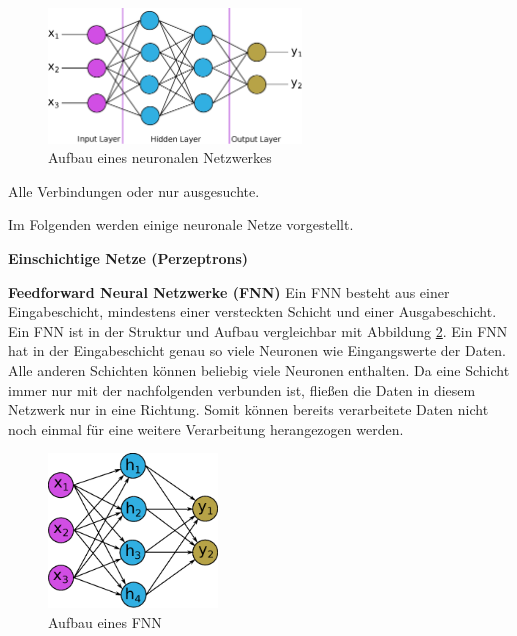 
\begin{figure}[!ht]
	\includegraphics[width=0.6\textwidth]{content/chapter_basics/images/neuronal_network.eps}
	\centering
	\caption{Aufbau eines neuronalen Netzwerkes}
	\label{img:neural_network}
\end{figure}

Alle Verbindungen oder nur ausgesuchte.\vspace{0.2cm}

Im Folgenden werden einige neuronale Netze vorgestellt.\vspace{0.2cm}

\textbf{Einschichtige Netze (Perzeptrons)}\vspace{0.2cm}

\textbf{Feedforward Neural Netzwerke (FNN)}\vspace{0.2cm}
Ein FNN besteht aus einer Eingabeschicht, mindestens einer versteckten Schicht und einer Ausgabeschicht. Ein FNN ist in der Struktur und Aufbau vergleichbar mit Abbildung \ref{img:neural_network_fnn}. Ein FNN hat in der Eingabeschicht genau so viele Neuronen wie Eingangswerte der Daten. Alle anderen Schichten können beliebig viele Neuronen enthalten. Da eine Schicht immer nur mit der nachfolgenden verbunden ist, fließen die Daten in diesem Netzwerk nur in eine Richtung. Somit können bereits verarbeitete Daten nicht noch einmal für eine weitere Verarbeitung herangezogen werden.

\begin{figure}[!ht]
	\includegraphics[width=0.4\textwidth]{content/chapter_basics/images/neuronal_network_fnn.eps}
	\centering
	\caption{Aufbau eines FNN}
	\label{img:neural_network_fnn}
\end{figure}

